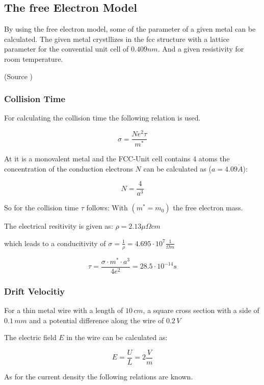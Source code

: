 \subsection{The free Electron Model} \label{chap1}

By using the free electron model, some of the parameter
of a given metal can be calculated. The given metal
crystllizes in the fcc structure with a lattice parameter 
for the convential unit cell of $0.409nm$. And a given 
resistivity for room temperature.

(Source \cite[Elementary Solid State Physics Chapter 4]{elementary_SSP})

\subsubsection*{Collision Time}

For calculating the collision time the following relation
is used.

\begin{equation}
    \sigma = \frac{N e^2 \tau}{m^*}
\end{equation}


At it is a monovalent metal and the FCC-Unit cell contains 
4 atoms the concentration of the conduction electrons $N$ can be
calculated as ($a = 4.09 \mathring{A}$):

$$N =\frac{4}{a^3}$$

So for the collision time $\tau$ follows:
With $(m^* = m_0)$ the free electron mass.

The electrical resitivity is given as:
$\rho = 2.13 \mu \Omega cm$

which leads to a conducitivity of
$\sigma = \frac{1}{\rho} = 4.695\cdot 10^7 \frac{1}{\Omega m}$


$$\tau =\frac{\sigma \cdot m^* \cdot a^3}{4e^2} = 28.5 \cdot 10^{-14}s$$

\subsubsection*{Drift Velocitiy}

For a thin metal wire with a length of $10 \, cm$, a square cross section with 
a side of $0.1 \, mm$ and a potential difference along the wire of $0.2 \, V$

The electric field $E$ in the wire can be calculated as: 

$$E = \frac{U}{L} = 2 \frac{V}{m}$$

As for the current density the following relations are known.

